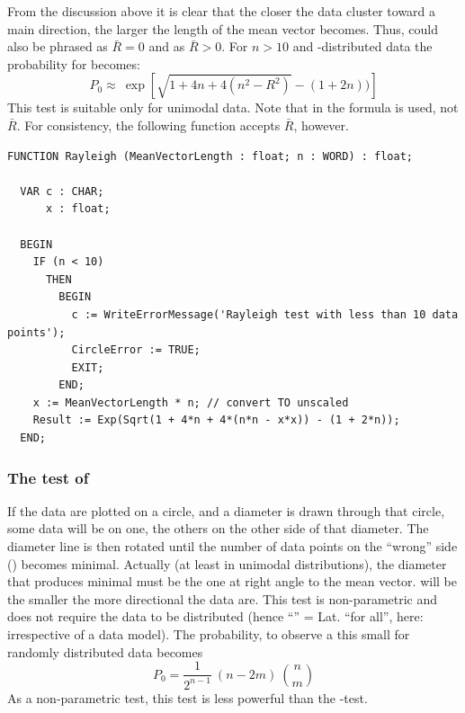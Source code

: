 \begin{refsection}
From the discussion above it is clear that the closer the data cluster toward a main direction, the larger the length of the mean vector becomes. Thus, \textbf{} could also be phrased as \( \bar{R} = 0 \) and \textbf{} as \( \bar{R} > 0 \). For \( n > 10 \) and -distributed data the probability for \textbf{} becomes:
\begin{equation}
  P_0 \approx\ \exp \left[\sqrt{1 + 4n + 4(n^2 - R^2)} - (1 + 2n))\right]
\end{equation}
This test is suitable only for unimodal data. Note that in the formula  is used, not \( \bar{R} \). For consistency, the following function accepts \( \bar{R} \), however.

\begin{lstlisting}[caption=Rayleigh-test]
  FUNCTION Rayleigh (MeanVectorLength : float; n : WORD) : float;

  VAR c : CHAR;
      x : float;

  BEGIN
    IF (n < 10)
      THEN
        BEGIN
          c := WriteErrorMessage('Rayleigh test with less than 10 data points');
          CircleError := TRUE;
          EXIT;
        END;
    x := MeanVectorLength * n; // convert TO unscaled
    Result := Exp(Sqrt(1 + 4*n + 4*(n*n - x*x)) - (1 + 2*n));
  END;
\end{lstlisting}


\subsubsection{The  test of }

If the data are plotted on a circle, and a diameter is drawn through that circle, some data will be on one, the others on the other side of that diameter. The diameter line is then rotated until the number of data points on the ``wrong'' side () becomes minimal. Actually (at least in unimodal distributions), the diameter that produces minimal  must be the one at right angle to the mean vector.  will be the smaller the more directional the data are. This test is non-parametric and does not require the data to be  distributed (hence ``'' = Lat. ``for all'', here: irrespective of a data model). The probability, to observe a  this small for randomly distributed data becomes
\begin{equation}
  P_0 = \frac{1}{2^{n-1}}\ (n - 2m)\ \binom{n}{m}
\end{equation}
As a non-parametric test, this test is less powerful than the -test.


\end{refsection}
